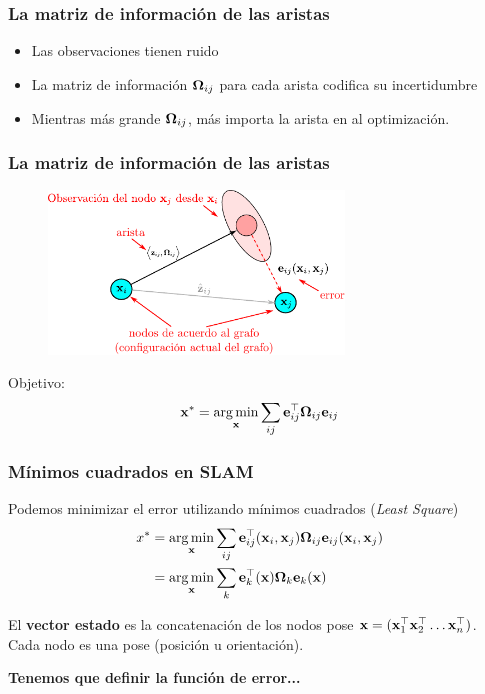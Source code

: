 \begin{frame}
    \frametitle{La matriz de información de las aristas}
    \begin{itemize}
        \item Las observaciones tienen ruido
        \item La matriz de información $\boldsymbol{\mathbf{\Omega}}_{ij}$ para cada arista codifica su incertidumbre
        \item Mientras más grande $\boldsymbol{\mathbf{\Omega}}_{ij}$, más importa la arista en al optimización.
    \end{itemize}
    
\end{frame}

\begin{frame}
    \frametitle{La matriz de información de las aristas}
    \begin{figure}[!h]
        \includegraphics[width=0.7\textwidth]{images/factor_graph_edge_example.pdf}
    \end{figure}

    Objetivo:
    \begin{equation*}
        \boldsymbol{\mathbf{x}}^{*} = \operatorname*{arg\,min}_{\boldsymbol{\mathbf{x}}} \sum_{ij} \boldsymbol{\mathbf{e}}^{\top}_{ij} \boldsymbol{\mathbf{\Omega}}_{ij} \boldsymbol{\mathbf{e}}_{ij}
    \end{equation*}
    
\end{frame}



\begin{frame}
    \frametitle{Mínimos cuadrados en SLAM}
    Podemos minimizar el error utilizando mínimos cuadrados (\emph{Least Square})
    \begin{align*}
        x^{*} &= \operatorname*{arg\,min}_{\boldsymbol{\mathbf{x}}} \sum_{ij} \boldsymbol{\mathbf{e}}^{\top}_{ij}(\boldsymbol{\mathbf{x}}_{i},\boldsymbol{\mathbf{x}}_{j}) \boldsymbol{\mathbf{\Omega}}_{ij} \boldsymbol{\mathbf{e}}_{ij}(\boldsymbol{\mathbf{x}}_{i},\boldsymbol{\mathbf{x}}_{j})\\
                 &= \operatorname*{arg\,min}_{\boldsymbol{\mathbf{x}}} \sum_{k} \boldsymbol{\mathbf{e}}^{\top}_{k}(\boldsymbol{\mathbf{x}}) \boldsymbol{\mathbf{\Omega}}_{k} \boldsymbol{\mathbf{e}}_{k}(\boldsymbol{\mathbf{x}})
    \end{align*}
    
    El {\bf vector estado} es la concatenación de los nodos pose $\stateBold = (\stateBold_{1}^{\top} \stateBold_{2}^{\top} \dots \stateBold_{n}^{\top})$. Cada nodo es una pose (posición u orientación).
    
    \vspace{2em}
    {\bf Tenemos que definir la función de error...}
\end{frame}

